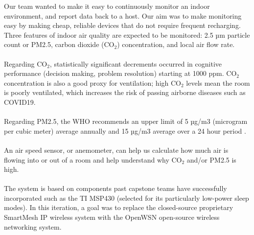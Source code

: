 Our team wanted to make it easy to continuously monitor an indoor environment, and report data back to a host. Our aim was to make monitoring easy by making cheap, reliable devices that do not require frequent recharging. Three features of indoor air quality are expected to be monitored: 2.5 µm particle count or PM2.5, carbon dioxide (CO$_2$) concentration, and local air flow rate.\\
\\
Regarding CO$_2$, statistically significant decrements occurred in cognitive performance
(decision making, problem resolution) starting at 1000 ppm.  CO$_2$  concentration is also a
good proxy for ventilation; high CO$_2$ levels mean the room is poorly ventilated, which increases
the risk of passing airborne diseases such as COVID19.\\
\\
Regarding PM2.5, the WHO recommends an upper limit of 5 µg/m3 (microgram per cubic
meter) average annually and 15 µg/m3 average over a 24 hour period . \\
\\
An air speed sensor, or anemometer, can help us calculate how much air is flowing into or out of
a room and help understand why CO$_2$ and/or PM2.5 is high. \\
\\
The system is based on components past capstone teams have successfully incorporated
such as the TI MSP430 (selected for its particularly low-power sleep modes). In this iteration, a goal was to
replace the closed-source proprietary SmartMesh IP wireless system with the OpenWSN open-source wireless networking system.\\
\\

